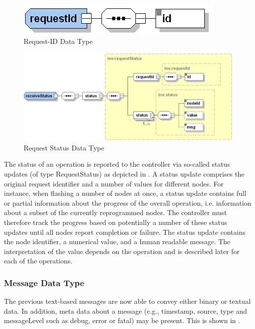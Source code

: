 	\begin{figure}[htb]
		\centering
		\includegraphics[width=0.45\columnwidth]{images/datatype-requestid}
		\caption{Request-ID Data Type}
		\label{fig:datatype-requestid}
	\end{figure}
	\begin{figure}[htb]
		\centering
		\includegraphics[width=0.9\columnwidth]{images/datatype-request-status}
		\caption{Request Status Data Type}
		\label{fig:datatype-request-status}
	\end{figure}

The status of an operation is reported to the controller via so-called status updates (of type RequestStatus) as depicted in . A status update comprises the original request identifier and a number of values for different nodes. For instance, when flashing a number of nodes at once, a status update contains full or partial information about the progress of the overall operation, i.e. information about a subset of the currently reprogrammed nodes. The controller must therefore track the progress based on potentially a number of these status updates until all nodes report completion or failure. The status update contains the node identifier, a numerical value, and a human readable message. The interpretation of the value depends on the operation and is described later for each of the operations.

		\subsubsection{Message Data Type}
The previous text-based messages are now able to convey either binary or textual data. In addition, meta data about a message (e.g., timestamp, source, type and messageLevel such as debug, error or fatal) may be present. This is shown in .

